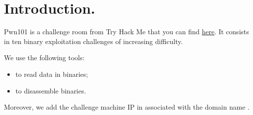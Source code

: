 \section{Introduction.}
\par Pwn101 is a challenge room from Try Hack Me that you can find \href{https://tryhackme.com/room/pwn101}{here}. It consists in ten binary exploitation challenges of increasing difficulty.
\par We use the following tools:
\begin{itemize}
	\item {} to read data in binaries;
	\item {} to disassemble binaries.
\end{itemize}
\par Moreover, we add the challenge machine IP in  associated with the domain name .
